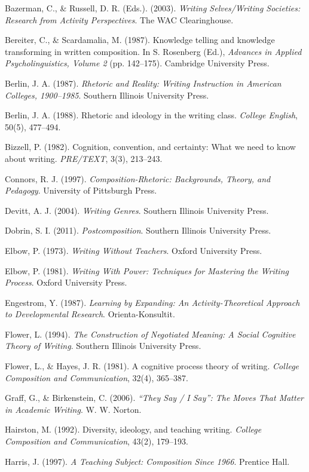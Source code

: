 \documentclass[12pt]{article}
\begin{document}
Bazerman, C., \& Russell, D. R. (Eds.). (2003). \textit{Writing Selves/Writing Societies: Research from Activity Perspectives}. The WAC Clearinghouse.

Bereiter, C., \& Scardamalia, M. (1987). Knowledge telling and knowledge transforming in written composition. In S. Rosenberg (Ed.), \textit{Advances in Applied Psycholinguistics, Volume 2} (pp. 142--175). Cambridge University Press.

Berlin, J. A. (1987). \textit{Rhetoric and Reality: Writing Instruction in American Colleges, 1900--1985}. Southern Illinois University Press.

Berlin, J. A. (1988). Rhetoric and ideology in the writing class. \textit{College English}, 50(5), 477--494.

Bizzell, P. (1982). Cognition, convention, and certainty: What we need to know about writing. \textit{PRE/TEXT}, 3(3), 213--243.

Connors, R. J. (1997). \textit{Composition-Rhetoric: Backgrounds, Theory, and Pedagogy}. University of Pittsburgh Press.

Devitt, A. J. (2004). \textit{Writing Genres}. Southern Illinois University Press.

Dobrin, S. I. (2011). \textit{Postcomposition}. Southern Illinois University Press.

Elbow, P. (1973). \textit{Writing Without Teachers}. Oxford University Press.

Elbow, P. (1981). \textit{Writing With Power: Techniques for Mastering the Writing Process}. Oxford University Press.

Engestrom, Y. (1987). \textit{Learning by Expanding: An Activity-Theoretical Approach to Developmental Research}. Orienta-Konsultit.

Flower, L. (1994). \textit{The Construction of Negotiated Meaning: A Social Cognitive Theory of Writing}. Southern Illinois University Press.

Flower, L., \& Hayes, J. R. (1981). A cognitive process theory of writing. \textit{College Composition and Communication}, 32(4), 365--387.

Graff, G., \& Birkenstein, C. (2006). \textit{``They Say / I Say'': The Moves That Matter in Academic Writing}. W. W. Norton.

Hairston, M. (1992). Diversity, ideology, and teaching writing. \textit{College Composition and Communication}, 43(2), 179--193.

Harris, J. (1997). \textit{A Teaching Subject: Composition Since 1966}. Prentice Hall.
\end{document}
